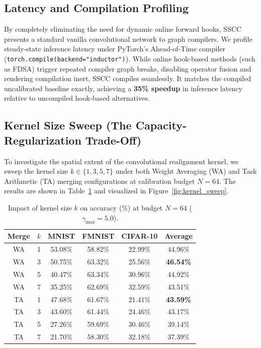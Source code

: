 \documentclass{article}
\theoremstyle{plain}
\theoremstyle{definition}
\theoremstyle{remark}
\begin{document}
\subsection{Latency and Compilation Profiling}
By completely eliminating the need for dynamic online forward hooks, SSCC presents a standard vanilla convolutional network to graph compilers. We profile steady-state inference latency under PyTorch's Ahead-of-Time compiler (\texttt{torch.compile(backend="inductor")}). While online hook-based methods (such as FDSA) trigger repeated compiler graph breaks, disabling operator fusion and rendering compilation inert, SSCC compiles seamlessly. It matches the compiled uncalibrated baseline exactly, achieving a \textbf{35\% speedup} in inference latency relative to uncompiled hook-based alternatives.

\subsection{Kernel Size Sweep (The Capacity-Regularization Trade-Off)}
To investigate the spatial extent of the convolutional realignment kernel, we sweep the kernel size $k \in \{1, 3, 5, 7\}$ under both Weight Averaging (WA) and Task Arithmetic (TA) merging configurations at calibration budget $N=64$. The results are shown in Table~\ref{tab:ablation_kernel} and visualized in Figure~\ref{fig:kernel_sweep}.

\begin{table}[h]
\caption{Impact of kernel size $k$ on accuracy (\%) at budget $N=64$ ($\gamma_{\text{max}} = 5.0$).}
\label{tab:ablation_kernel}
\vskip 0.05in
\begin{center}\setlength{\tabcolsep}{4pt}
\begin{small}
\begin{tabular}{cccccc}
\toprule
Merge & $k$ & MNIST & FMNIST & CIFAR-10 & Average \\
\midrule
WA & 1 & 53.08\% & 58.82\% & 22.99\% & 44.96\% \\
WA & 3 & 50.75\% & 63.32\% & 25.56\% & \textbf{46.54\%} \\
WA & 5 & 40.47\% & 63.34\% & 30.96\% & 44.92\% \\
WA & 7 & 35.25\% & 62.69\% & 32.59\% & 43.51\% \\
\midrule
TA & 1 & 47.68\% & 61.67\% & 21.41\% & \textbf{43.59\%} \\
TA & 3 & 43.60\% & 61.44\% & 24.46\% & 43.17\% \\
TA & 5 & 27.26\% & 59.69\% & 30.46\% & 39.14\% \\
TA & 7 & 21.70\% & 58.30\% & 32.18\% & 37.39\% \\
\bottomrule
\end{tabular}
\end{small}
\end{center}
\vskip -0.1in
\end{table}
\end{document}
